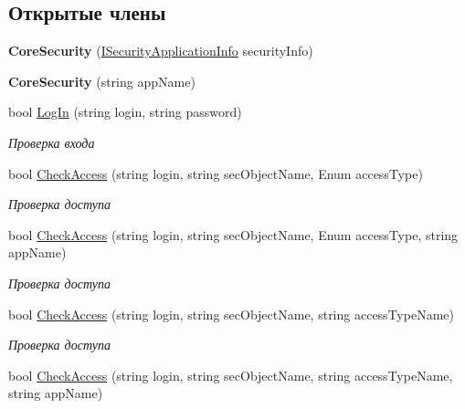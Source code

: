 \subsection*{Открытые члены}
\begin{DoxyCompactItemize}
\item 
\mbox{\label{class_security_1_1_core_security_a87417c45b77507f17661f2596caf0ec7}} 
{\bfseries Core\+Security} (\hyperlink{interface_security_1_1_interfaces_1_1_i_security_application_info}{I\+Security\+Application\+Info} security\+Info)
\item 
\mbox{\label{class_security_1_1_core_security_aec2b00266df59a6fb1170d0d5758e078}} 
{\bfseries Core\+Security} (string app\+Name)
\item 
bool \hyperlink{class_security_1_1_core_security_a87672cfd35522b393c3139daa4960258}{Log\+In} (string login, string password)
\begin{DoxyCompactList}\small\item\em Проверка входа \end{DoxyCompactList}\item 
bool \hyperlink{class_security_1_1_core_security_a8210ce9453e545a46048a95b1e35837e}{Check\+Access} (string login, string sec\+Object\+Name, Enum access\+Type)
\begin{DoxyCompactList}\small\item\em Проверка доступа \end{DoxyCompactList}\item 
bool \hyperlink{class_security_1_1_core_security_a7a9a64fd5293e9b23afe501c16e71e2b}{Check\+Access} (string login, string sec\+Object\+Name, Enum access\+Type, string app\+Name)
\begin{DoxyCompactList}\small\item\em Проверка доступа \end{DoxyCompactList}\item 
bool \hyperlink{class_security_1_1_core_security_ace03c1422a670fd976a9a89af51090ba}{Check\+Access} (string login, string sec\+Object\+Name, string access\+Type\+Name)
\begin{DoxyCompactList}\small\item\em Проверка доступа \end{DoxyCompactList}\item 
bool \hyperlink{class_security_1_1_core_security_a7e47a82a3d9113388e23988e344d6dbf}{Check\+Access} (string login, string sec\+Object\+Name, string access\+Type\+Name, string app\+Name)

\end{DoxyCompactItemize}
